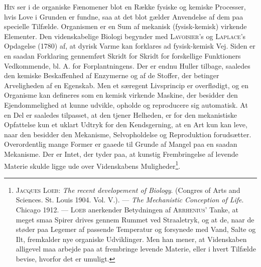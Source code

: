 \documentclass[12pt]{article}
\begin{document}
\textsc{Hin} ser i de organiske Fænomener blot en Række fysiske og kemiske Processer,
hvis Love i Grunden er fundne, saa at det blot gælder Anvendelse af dem
paa specielle Tilfælde. Organismen er en Sum af mekanisk (fysisk-kemisk) virkende
Elementer. Den videnskabelige Biologi begynder med \textsc{Lavoisier}'s og \textsc{Laplace}'s
Opdagelse (1780) af, at dyrisk Varme kan forklares ad fysisk-kemisk Vej. Siden er en
saadan Forklaring gennemført Skridt for Skridt for forskellige Funktioners
Vedkommende, bl. A. for Forplantningens. Der er endnu Huller tilbage, saaledes den
kemiske Beskaffenhed af Enzymerne og af de Stoffer, der betinger Arveligheden af
en Egenskab. Men et særegent Livsprincip er overflødigt, og en Organisme kan
defineres som en kemisk virkende Maskine, der besidder den Ejendommelighed at
kunne udvikle, opholde og reproducere sig automatisk. At en Del er saaledes
tilpasset, at den tjener Helheden, er for den mekanistiske Opfattelse kun et uklart
Udtryk for den Kendsgerning, at en Art kun kan leve, naar den besidder den
Mekanisme, Selvopholdelse og Reproduktion forudsætter. Overordentlig mange
Former er gaaede til Grunde af Mangel paa en saadan Mekanisme. Der er Intet, der
tyder paa, at kunstig Frembringelse af levende Materie skulde ligge ude over
Videnskabens Muligheder\footnote{%
\textsc{Jacques Loeb}: \textit{The recent
developement of Biology}. (Congres of Arts and Sciences. St. Louis 1904.
Vol. V.). --- \textit{The Mechanistic Conception of Life}. Chicago 1912. ---
\textsc{Loeb} anerkender Betydningen af \textsc{Arrhenius}' Tanke, at meget smaa
Spirer drives gennem Rummet ved Straaletryk, og at de, naar de støder paa
Legemer af passende Temperatur og forsynede med Vand, Salte og Ilt, fremkalder
nye organiske Udviklinger. Men han mener, at Videnskaben alligevel maa arbejde
paa at frembringe levende Materie, eller i hvert Tilfælde bevise, hvorfor det er
umuligt.}.
\end{document}
